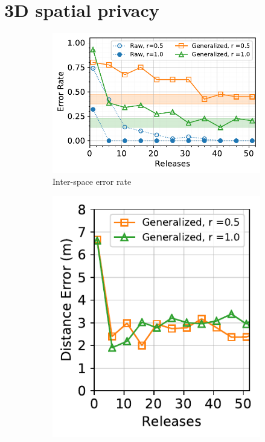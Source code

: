 \section{3D spatial privacy}

\begin{figure}[t]
	\centering
	\vspace{-2mm}
	\begin{subfigure}{0.61\columnwidth}
		\includegraphics[width=\columnwidth]{figures/cdng-successive-interspace.pdf}
		\vspace{-5mm}
		\caption{\small Inter-space error rate\newline }
		\label{fig:successive-interspace}
	\end{subfigure}
	\begin{subfigure}{0.37\columnwidth}
		\includegraphics[width=\columnwidth]{figures/cdng-successive-intraspace.pdf}

\end{subfigure}
\end{figure}
